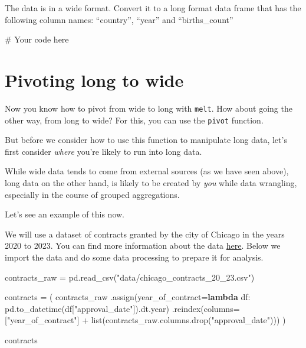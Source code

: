 \documentclass[
  letterpaper,
  DIV=11,
  numbers=noendperiod]{scrreprt}
\newenvironment{Shaded}{\begin{snugshade}}{\end{snugshade}}
\newcommand{\BuiltInTok}[1]{\textcolor[rgb]{0.00,0.23,0.31}{#1}}
\newcommand{\CommentTok}[1]{\textcolor[rgb]{0.37,0.37,0.37}{#1}}
\newcommand{\KeywordTok}[1]{\textcolor[rgb]{0.00,0.23,0.31}{\textbf{#1}}}
\newcommand{\NormalTok}[1]{\textcolor[rgb]{0.00,0.23,0.31}{#1}}
\newcommand{\OperatorTok}[1]{\textcolor[rgb]{0.37,0.37,0.37}{#1}}
\newcommand{\StringTok}[1]{\textcolor[rgb]{0.13,0.47,0.30}{#1}}
\begin{document}
\begin{tcolorbox}
The data is in a wide format. Convert it to a long format data frame
that has the following column names: ``country'', ``year'' and
``births\_count''

\begin{Shaded}
\begin{Highlighting}[]
\CommentTok{\# Your code here}
\end{Highlighting}
\end{Shaded}

\end{tcolorbox}

\section{Pivoting long to wide}\label{pivoting-long-to-wide}

Now you know how to pivot from wide to long with \texttt{melt}. How
about going the other way, from long to wide? For this, you can use the
\texttt{pivot} function.

But before we consider how to use this function to manipulate long data,
let's first consider \emph{where} you're likely to run into long data.

While wide data tends to come from external sources (as we have seen
above), long data on the other hand, is likely to be created by
\emph{you} while data wrangling, especially in the course of grouped
aggregations.

Let's see an example of this now.

We will use a dataset of contracts granted by the city of Chicago in the
years 2020 to 2023. You can find more information about the data
\href{https://data.cityofchicago.org/Administration-Finance/Contracts/rsxa-ify5/}{here}.
Below we import the data and do some data processing to prepare it for
analysis.

\begin{Shaded}
\begin{Highlighting}[]
\NormalTok{contracts\_raw }\OperatorTok{=}\NormalTok{ pd.read\_csv(}\StringTok{"data/chicago\_contracts\_20\_23.csv"}\NormalTok{)}

\NormalTok{contracts }\OperatorTok{=}\NormalTok{ (}
\NormalTok{    contracts\_raw}
\NormalTok{    .assign(year\_of\_contract}\OperatorTok{=}\KeywordTok{lambda}\NormalTok{ df: pd.to\_datetime(df[}\StringTok{"approval\_date"}\NormalTok{]).dt.year)}
\NormalTok{    .reindex(columns}\OperatorTok{=}\NormalTok{[}\StringTok{"year\_of\_contract"}\NormalTok{] }\OperatorTok{+} \BuiltInTok{list}\NormalTok{(contracts\_raw.columns.drop(}\StringTok{"approval\_date"}\NormalTok{)))}
\NormalTok{)}

\NormalTok{contracts}
\end{Highlighting}
\end{Shaded}
\end{document}
